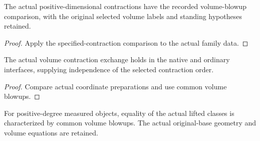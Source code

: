 \begin{corollary}

\label{s7-6}


\leanok

The actual positive-dimensional contractions have the recorded volume-blowup comparison, with the original selected volume labels and standing hypotheses retained.

\end{corollary}

\begin{proof}


\leanok

Apply the specified-contraction comparison to the actual family data.

\end{proof}

\begin{lemma}

\label{s7-7}


\leanok

The actual volume contraction exchange holds in the native and ordinary interfaces, supplying independence of the selected contraction order.

\end{lemma}

\begin{proof}


\leanok

Compare actual coordinate preparations and use common volume blowups.

\end{proof}

\begin{proposition}

\label{s7-8}


\leanok

For positive-degree measured objects, equality of the actual lifted classes is characterized by common volume blowups. The actual original-base geometry and volume equations are retained.

\end{proposition}

